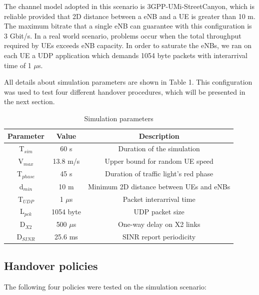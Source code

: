 \documentclass[conference,10pt]{IEEEtran}
\begin{document}
The channel model adopted in this scenario is 3GPP-UMi-StreetCanyon, which is reliable provided that 2D distance between a eNB and a UE is greater than 10 m. The maximum bitrate that a single eNB can guarantee with this configuration is 3 Gbit/s. In a real world scenario, problems occur when the total throughput required by UEs exceeds eNB capacity. In order to saturate the eNBs, we ran on each UE a UDP application which demands 1054 byte packets with interarrival time of 1 $\mu$s.

All details about simulation parameters are shown in Table 1. This configuration was used to test four different handover procedures, which will be presented in the next section.


\begin{table}[h]
	\begin{center}
		\begin{tabular}{ccc}
			\toprule
			
			Parameter & Value & Description  \\
			\midrule
			
			T$_{sim}$ & 60 s & Duration of the simulation \\
			V$_{max}$ &  13.8 m/s & Upper bound for random UE speed \\	
			T$_{phase}$  & 45 s & Duration of traffic light's red phase \\ 			
			d$_{min}$ & 10 m & Minimum 2D distance between UEs and eNBs \\
			T$_{UDP}$ & 1 $\mu$s & Packet interarrival time \\
			L$_{pck}$ & 1054 byte & UDP packet size \\		
			D$_{X2}$ & 500 $\mu$s & One-way delay on X2 links \\
			D$_{SINR}$ & 25.6 ms & SINR report periodicity \\
			\bottomrule
		\end{tabular}
			\caption{Simulation parameters}
	\end{center}
	\label{tab:bay3}
\end{table}

\noindent
\subsection{Handover policies}
The following four policies were tested on the simulation scenario:
\end{document}
